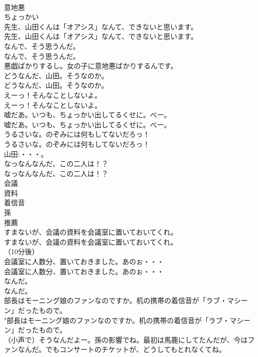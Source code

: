 \documentclass[8pt]{extreport}
\begin{document}
\begin{CJK}{UTF8}{min}
\\	意地悪
\\	ちょっかい
\\	先生、山田くんは「オアシス」なんて、できないと思います。	
\\	先生、山田くんは「オアシス」なんて、できないと思います。 
\\	なんで、そう思うんだ。	
\\	なんで、そう思うんだ。 
\\	悪戯ばかりするし。女の子に意地悪ばかりするんです。	
\\	どうなんだ、山田。そうなのか。	
\\	どうなんだ、山田。そうなのか。 
\\	えーっ！そんなことしないよ。	
\\	えーっ！そんなことしないよ。 
\\	嘘だあ。いつも、ちょっかい出してるくせに。べー。	
\\	嘘だあ。いつも、ちょっかい出してるくせに。べー。 
\\	うるさいな。のぞみには何もしてないだろっ！	
\\	うるさいな。のぞみには何もしてないだろっ！ 
\\	山田:・・・。	
\\	なっなんなんだ、この二人は！？	
\\	なっなんなんだ、この二人は！？ 
\\	会議
\\	資料
\\	着信音
\\	孫
\\	推薦
\\	すまないが、会議の資料を会議室に置いておいてくれ。	
\\	すまないが、会議の資料を会議室に置いておいてくれ。 
\\	（10分後）	
\\	会議室に人数分、置いておきました。あのぉ・・・	
\\	会議室に人数分、置いておきました。あのぉ・・・ 
\\	なんだ。	
\\	なんだ。 
\\	部長はモーニング娘のファンなのですか。机の携帯の着信音が「ラブ・マシーン」だったもので。	
\\	"部長はモーニング娘のファンなのですか。机の携帯の着信音が「ラブ・マシーン」だったもので。 
\\	（小声で）そうなんだよー。孫の影響でね。最初は馬鹿にしてたんだが、今はファンなんだ。でもコンサートのチケットが、どうしてもとれなくてね。	

\end{CJK}
\end{document}
